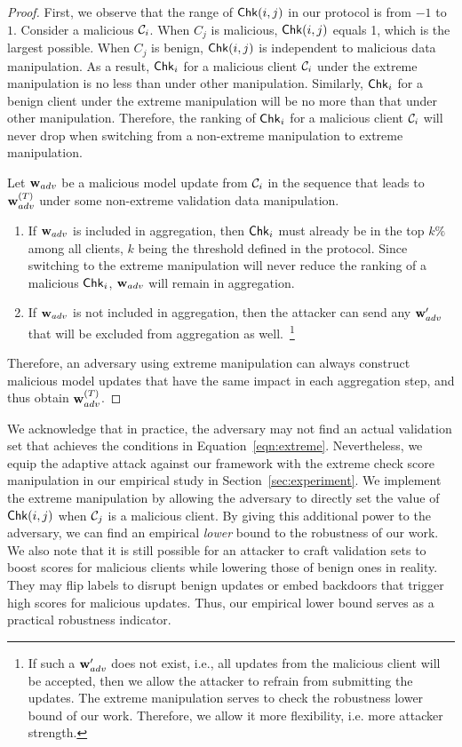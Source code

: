 \begin{proof}
    First, we observe that the range of $\mathsf{Chk}(i,j)$ in our protocol is from $-1$ to $1$.
    Consider a malicious $\mathcal{C}_i$. When $C_j$ is malicious, $\mathsf{Chk}(i, j)$ equals 1, which is the largest possible. When $C_j$ is benign, $\mathsf{Chk}(i, j)$ is independent to malicious data manipulation. As a result, $\mathsf{Chk}_i$ for a malicious client $\mathcal{C}_i$ under the extreme manipulation is no less than under other manipulation. Similarly, $\mathsf{Chk}_i$ for a benign client under the extreme manipulation will be no more than that under other manipulation. Therefore, the ranking of $\mathsf{Chk}_i$ for a malicious client $\mathcal{C}_i$ will never drop when switching from a non-extreme manipulation to extreme manipulation.

    Let $\mathbf{w}_{adv}$ be a malicious model update from $\mathcal{C}_i$ in the sequence that leads to $\mathbf{w}^{(T)}_{adv}$ under some non-extreme validation data manipulation.
    \begin{enumerate}
        \item
        If $\mathbf{w}_{adv}$ is included in aggregation, then $\mathsf{Chk}_i$ must already be in the top $k\%$ among all clients, $k$ being the threshold defined in the protocol. Since switching to the extreme manipulation will never reduce the ranking of a malicious $\mathsf{Chk}_i$, $\mathbf{w}_{adv}$ will remain in aggregation. 
        \item
        If $\mathbf{w}_{adv}$ is not included in aggregation, then the attacker can send any $\mathbf{w}'_{adv}$ that will be excluded from aggregation as well.~\footnote{If such a $\mathbf{w}'_{adv}$ does not exist, i.e., all updates from the malicious client will be accepted, then we allow the attacker to refrain from submitting the updates. The extreme manipulation serves to check the robustness lower bound of our work. Therefore, we allow it more flexibility, i.e. more attacker strength.}
    \end{enumerate}
    Therefore, an adversary using extreme manipulation can always construct malicious model updates that have the same impact in each aggregation step, and thus obtain $\mathbf{w}^{(T)}_{adv}$.
\end{proof}

 We acknowledge that in practice, the adversary may not find an actual validation set that achieves the conditions in Equation~\ref{eqn:extreme}. Nevertheless, we equip the adaptive attack against our framework with the extreme check score manipulation in our empirical study in Section~\ref{sec:experiment}.
We implement the extreme manipulation by allowing the adversary to directly set the value of $\mathsf{Chk}(i, j)$ when $\mathcal{C}_j$ is a malicious client. By giving this additional power to the adversary, we can find an empirical \emph{lower} bound to the robustness of our work. 
We also note that it is still possible for an attacker to craft validation sets to boost scores for malicious clients while lowering those of benign ones in reality. 
They may flip labels to disrupt benign updates or embed backdoors that trigger high scores for malicious updates.
Thus, our empirical lower bound serves as a practical robustness indicator.
